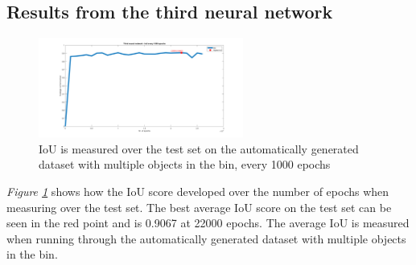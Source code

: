 \subsection{Results from the third neural network}
\begin{figure}[h]
    \centering
    \includegraphics[width=0.6\textwidth, trim={5cm 0 4cm 0},clip]{graphics/results/thirdneuralnetwork.png}
    \caption{IoU is measured over the test set on the automatically generated dataset with multiple objects in the bin, every 1000 epochs}
    \label{fig:v3neuralnetwork}
\end{figure}
\textit{Figure \ref{fig:v3neuralnetwork}} shows how the IoU score developed over the number of epochs when measuring over the test set. The best average IoU score on the test set can be seen in the red point and is 0.9067 at 22000 epochs. The average IoU is measured when running through the automatically generated dataset with multiple objects in the bin.


